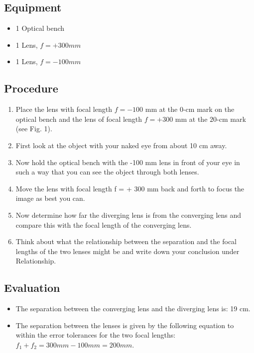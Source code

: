 \documentclass[12pt]{article}
\begin{document}
\subsection*{Equipment}
\begin{itemize}
    \item 1 Optical bench
    \item 1 Lens, $f=+300 mm$
    \item 1 Lens, $f=-100 mm$
\end{itemize}

\subsection*{Procedure}
\begin{enumerate}
    \item Place the lens with focal length $f = - 100$ mm at the $0$-cm mark on the optical bench and the lens of focal length $f= + 300$ mm at the $20$-cm mark (see Fig. 1). 
    \item First look at the object with your naked eye from about 10 cm away.  
    \item Now hold the optical bench with the -100 mm lens in front of your eye in such a way that you can see the object through both lenses. 
    \item Move the lens with focal length f = + 300 mm back and forth to focus the image as best you can. 
    \item Now determine how far the diverging lens is from the converging lens and compare this with the focal length of the converging lens. 
    \item Think about what the relationship between the separation and the focal lengths of the two lenses might be and write down your conclusion under Relationship.
\end{enumerate}

\subsection*{Evaluation}
\begin{itemize}
    \item The separation between the converging lens and the diverging lens is: 19 cm. 
    \item  The separation between the lenses is given by the following equation to within the error tolerances for the two focal lengths: $ f_1 + f_2 = 300 mm -100 mm = 200 mm $. 
\end{itemize}
    
\end{document}
